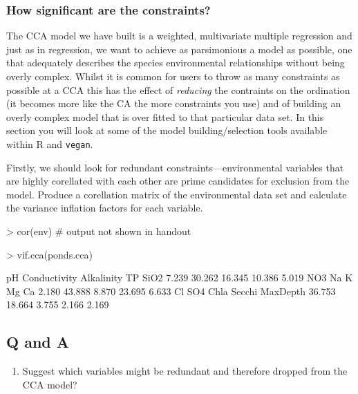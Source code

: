 \documentclass[a4paper,10pt]{article}
\newcommand{\R}{\textsf{R}\xspace}
\newcommand{\vegan}{\texttt{vegan}\xspace}
\begin{document}
\subsubsection{How significant are the constraints?}
The CCA model we have built is a weighted, multivariate multiple regression and just as in regression, we want to achieve as parsimonious a model as possible, one that adequately describes the species environmental relationships without being overly complex. Whilst it is common for users to throw as many constraints as possible at a CCA this has the effect of \emph{reducing} the contraints on the ordination (it becomes more like the CA the more constraints you use) and of building an overly complex model that is over fitted to that particular data set. In this section you will look at some of the model building/selection tools available within \R and \vegan.

Firstly, we should look for redundant constraints---environmental variables that are highly corellated with each other are prime candidates for exclusion from the model. Produce a corellation matrix of the environmental data set and calculate the variance inflation factors for each variable.

\begin{Schunk}
\begin{Sinput}
> cor(env) # output not shown in handout
\end{Sinput}
\end{Schunk}
\begin{Schunk}
\begin{Sinput}
> vif.cca(ponds.cca)
\end{Sinput}
\begin{Soutput}
          pH Conductivity   Alkalinity           TP         SiO2 
       7.239       30.262       16.345       10.386        5.019 
         NO3           Na            K           Mg           Ca 
       2.180       43.888        8.870       23.695        6.633 
          Cl          SO4         Chla       Secchi     MaxDepth 
      36.753       18.664        3.755        2.166        2.169 
\end{Soutput}
\end{Schunk}

\subsection*{Q and A}
\begin{enumerate}
\item Suggest which variables might be redundant and therefore dropped from the CCA model?
\end{enumerate}
\end{document}
